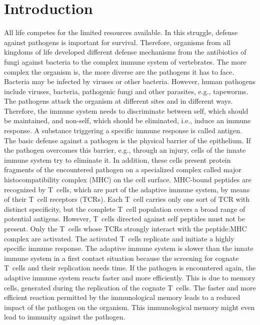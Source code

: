 \clearpage
\pagestyle{empty}
\cleardoublepage
\pagestyle{fancy}

\chapter{Introduction}
\label{cha:introduction}

All life competes for the limited resources available. In this struggle, defense against pathogens is important for survival. Therefore, organisms from all kingdoms of life developed different defense mechanisms from the antibiotics of fungi against bacteria to the complex immune system of vertebrates. The more complex the organism is, the more diverse are the pathogens it has to face. Bacteria may be infected by viruses or other bacteria. However, human pathogens include viruses, bacteria, pathogenic fungi and other parasites, e.g., tapeworms. The pathogens attack the organism at different sites and in different ways. Therefore, the immune system needs to discriminate between self, which should be maintained, and non-self, which should be eliminated, i.e., induce an immune response. A substance triggering a specific immune response is called antigen.\\
The basic defense against a pathogen is the physical barrier of the epithelium. If the pathogen overcomes this barrier, e.g., through an injury, cells of the innate immune system try to eliminate it. In addition, these cells present protein fragments of the encountered pathogen on a specialized complex called major histocompatibility complex (MHC) on the cell surface. MHC-bound peptides are recognized by T~cells, which are part of the adaptive immune system, by means of their T~cell receptors (TCRs). Each T~cell carries only one sort of TCR with distinct specificity, but the complete T~cell population covers a broad range of potential antigens. However, T~cells directed against self peptides must not be present. Only the T~cells whose TCRs strongly interact with the peptide:MHC complex are activated. The activated T~cells replicate and initiate a highly specific immune response. The adaptive immune system is slower than the innate immune system in a first contact situation because the screening for cognate T~cells and their replication needs time. If the pathogen is encountered again, the adaptive immune system reacts faster and more efficiently. This is due to memory cells, generated during the replication of the cognate T~cells. The faster and more efficient reaction permitted by the immunological memory leads to a reduced impact of the pathogen on the organism. This immunological memory might even lead to immunity against the pathogen.\\

